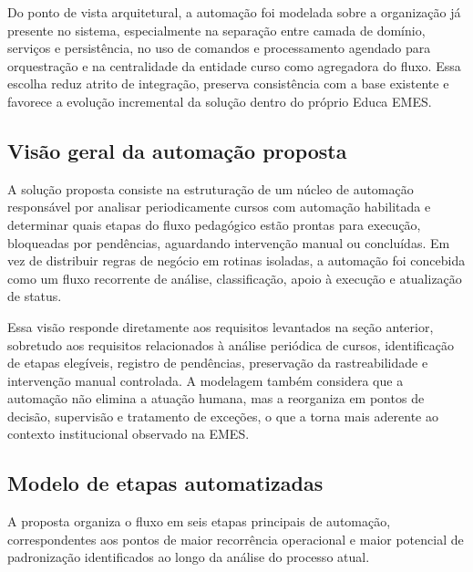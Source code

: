 Do ponto de vista arquitetural, a automação foi modelada sobre a
organização já presente no sistema, especialmente na separação entre
camada de domínio, serviços e persistência, no uso de comandos e
processamento agendado para orquestração e na centralidade da entidade
curso como agregadora do fluxo. Essa escolha reduz atrito de integração,
preserva consistência com a base existente e favorece a evolução
incremental da solução dentro do próprio Educa EMES.

\subsection{Visão geral da automação proposta}
\label{sec:metod:modelagem:visao-geral}

A solução proposta consiste na estruturação de um núcleo de automação
responsável por analisar periodicamente cursos com automação habilitada
e determinar quais etapas do fluxo pedagógico estão prontas para
execução, bloqueadas por pendências, aguardando intervenção manual ou
concluídas. Em vez de distribuir regras de negócio em rotinas isoladas,
a automação foi concebida como um fluxo recorrente de análise,
classificação, apoio à execução e atualização de status.

Essa visão responde diretamente aos requisitos levantados na seção
anterior, sobretudo aos requisitos relacionados à análise periódica de
cursos, identificação de etapas elegíveis, registro de pendências,
preservação da rastreabilidade e intervenção manual controlada. A
modelagem também considera que a automação não elimina a atuação humana,
mas a reorganiza em pontos de decisão, supervisão e tratamento de
exceções, o que a torna mais aderente ao contexto institucional
observado na EMES.

\subsection{Modelo de etapas automatizadas}
\label{sec:metod:modelagem:etapas}

A proposta organiza o fluxo em seis etapas principais de automação,
correspondentes aos pontos de maior recorrência operacional e maior
potencial de padronização identificados ao longo da análise do processo
atual.

